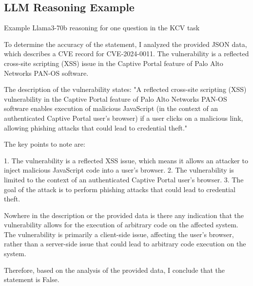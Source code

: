 \documentclass[conference]{IEEEtran}
\begin{document}
\vfill\null 

\subsection{LLM Reasoning Example}
Example Llama3-70b reasoning for one question in the KCV task
\begin{highlighted}{}
To determine the accuracy of the statement, I analyzed the provided JSON data, which describes a CVE record for CVE-2024-0011. The vulnerability is a reflected cross-site scripting (XSS) issue in the Captive Portal feature of Palo Alto Networks PAN-OS software.

The description of the vulnerability states: "A reflected cross-site scripting (XSS) vulnerability in the Captive Portal feature of Palo Alto Networks PAN-OS software enables execution of malicious JavaScript (in the context of an authenticated Captive Portal user’s browser) if a user clicks on a malicious link, allowing phishing attacks that could lead to credential theft."

The key points to note are:

1. The vulnerability is a reflected XSS issue, which means it allows an attacker to inject malicious JavaScript code into a user's browser.
2. The vulnerability is limited to the context of an authenticated Captive Portal user's browser.
3. The goal of the attack is to perform phishing attacks that could lead to credential theft.

Nowhere in the description or the provided data is there any indication that the vulnerability allows for the execution of arbitrary code on the affected system. The vulnerability is primarily a client-side issue, affecting the user's browser, rather than a server-side issue that could lead to arbitrary code execution on the system.

Therefore, based on the analysis of the provided data, I conclude that the statement is False.    
\end{highlighted}
\end{document}
